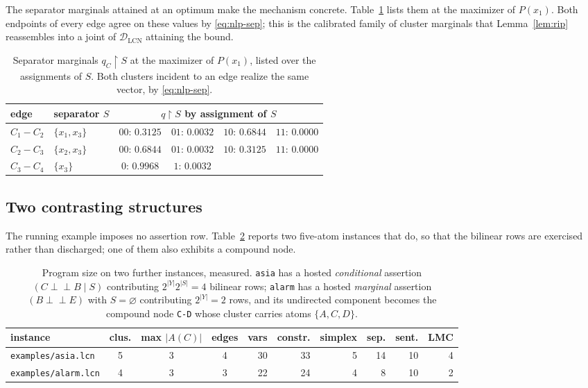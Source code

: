 \documentclass[11pt]{article}
\theoremstyle{definition}
\newcommand{\indep}{\perp\!\!\!\perp}
\newcommand{\DLCN}{\mathcal{D}_{\mathrm{LCN}}}
\newcommand{\restr}{\!\restriction\!}
\begin{document}
The separator marginals attained at an optimum make the mechanism concrete.
Table~\ref{tab:msgs} lists them at the maximizer of $P(x_1)$. Both endpoints of
every edge agree on these values by \eqref{eq:nlp-sep}; this is the calibrated
family of cluster marginals that Lemma~\ref{lem:rip} reassembles into a joint of
$\DLCN$ attaining the bound.

\begin{table}[ht]\centering\small
\caption{Separator marginals $q_C\restr S$ at the maximizer of $P(x_1)$, listed
over the assignments of $S$. Both clusters incident to an edge realize the same
vector, by \eqref{eq:nlp-sep}.}\label{tab:msgs}
\begin{tabular}{@{}llcccc@{}}
\toprule
edge & separator $S$ & \multicolumn{4}{c}{$q\restr S$ by assignment of $S$}\\
\midrule
$C_1\!-\!C_2$ & $\{x_1,x_3\}$ & $00{:}\,0.3125$ & $01{:}\,0.0032$
  & $10{:}\,0.6844$ & $11{:}\,0.0000$\\
$C_2\!-\!C_3$ & $\{x_2,x_3\}$ & $00{:}\,0.6844$ & $01{:}\,0.0032$
  & $10{:}\,0.3125$ & $11{:}\,0.0000$\\
$C_3\!-\!C_4$ & $\{x_3\}$     & $0{:}\,0.9968$  & $1{:}\,0.0032$
  & & \\
\bottomrule
\end{tabular}
\end{table}

\subsection{Two contrasting structures}

The running example imposes no assertion row. Table~\ref{tab:contrast} reports two
five-atom instances that do, so that the bilinear rows are exercised rather than
discharged; one of them also exhibits a compound node.

\begin{table}[ht]\centering\small
\caption{Program size on two further instances, measured. \texttt{asia} has a
hosted \emph{conditional} assertion $(C\indep B\mid S)$ contributing
$2^{|Y|}2^{|S|}=4$ bilinear rows; \texttt{alarm} has a hosted \emph{marginal}
assertion $(B\indep E)$ with $S=\varnothing$ contributing $2^{|Y|}=2$ rows, and
its undirected component becomes the compound node \texttt{C-D} whose cluster
carries atoms $\{A,C,D\}$.}\label{tab:contrast}
\begin{tabular}{@{}lcccrrrrrr@{}}
\toprule
instance & clus. & max $|A(C)|$ & edges & vars & constr. & simplex & sep. &
  sent. & LMC \\
\midrule
\texttt{examples/asia.lcn}  & 5 & 3 & 4 & 30 & 33 & 5 & 14 & 10 & 4 \\
\texttt{examples/alarm.lcn} & 4 & 3 & 3 & 22 & 24 & 4 &  8 & 10 & 2 \\
\bottomrule
\end{tabular}
\end{table}
\end{document}
